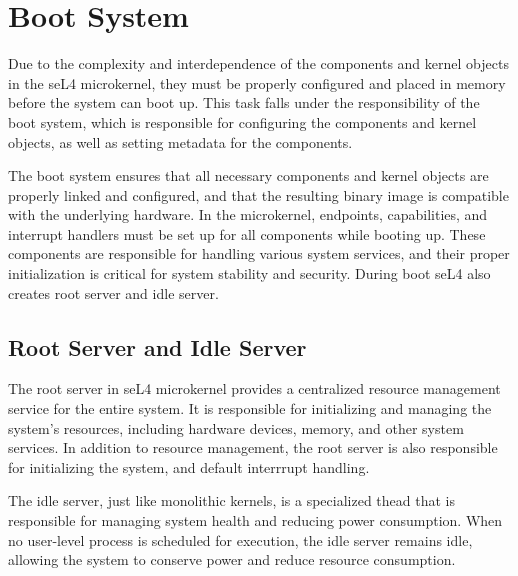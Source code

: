 \documentclass[
	a4paper, %
	11pt, %
	unnumberedsections, %
	twoside, %
]{LTJournalArticle}
\begin{document}
\section{Boot System}

Due to the complexity and interdependence of the components and kernel objects in the seL4 microkernel, they must be properly configured and placed in memory before the system can boot up. This task falls under the responsibility of the boot system, which is responsible for configuring the components and kernel objects, as well as setting metadata for the components.

The boot system ensures that all necessary components and kernel objects are properly linked and configured, and that the resulting binary image is compatible with the underlying hardware. In the microkernel, endpoints, capabilities, and interrupt handlers must be set up for all components while booting up. These components are responsible for handling various system services, and their proper initialization is critical for system stability and security. During boot seL4 also creates root server and idle server.

\subsection{Root Server and Idle Server}

The root server in seL4 microkernel provides a centralized resource management service for the entire system. It is responsible for initializing and managing the system's resources, including hardware devices, memory, and other system services. In addition to resource management, the root server is also responsible for initializing the system, and default interrrupt handling.

The idle server, just like monolithic kernels, is a specialized thead that is responsible for managing system health and reducing power consumption. When no user-level process is scheduled for execution, the idle server remains idle, allowing the system to conserve power and reduce resource consumption.
\end{document}
